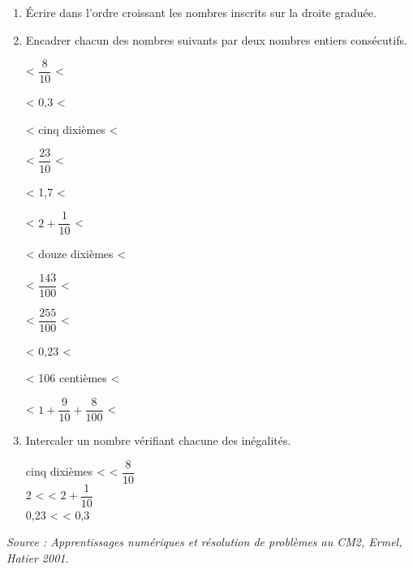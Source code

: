 \documentclass[nocrop]{sesamanuel_college_5e_new}
\begin{document}
\begin{activite}
\begin{QCM}
         \begin{enumerate}
            \item Écrire dans l'ordre croissant les nombres inscrits sur la droite graduée. \par \medskip            
               \pointilles \medskip
            \item Encadrer chacun des nombres suivants par deux nombres entiers consécutifs.
             \setlength{\columnsep}{1cm}           
             \begin{multicols}{3}  
                \pointilles{} < $\dfrac{8}{10}$ < \pointilles \par\bigskip
                \pointilles{} < 0,3 < \pointilles \par\medskip
                \pointilles{} < {\small cinq dixièmes} < \pointilles \par\bigskip
                \pointilles{} < $\dfrac{23}{10}$ < \pointilles \par\bigskip
                \pointilles{} < 1,7 < \pointilles \par\medskip
                \pointilles{} < $2+\dfrac{1}{10}$ < \pointilles \par\bigskip
                \pointilles{} < {\small douze dixièmes} < \pointilles \par\bigskip
                \pointilles{} < $\dfrac{143}{100}$ < \pointilles \par\bigskip
                \pointilles{} < $\dfrac{255}{100}$ < \pointilles \par\bigskip
                \pointilles{} < 0,23 < \pointilles \par\medskip
                \pointilles{} < {\small 106 centièmes} < \pointilles \par\bigskip
                \pointilles{} < $1+\dfrac{9}{10}+\dfrac{8}{100}$ < \pointilles
            \end{multicols}
            \item Intercaler un nombre vérifiant chacune des inégalités.
            \setlength{\columnsep}{1.5cm}
             \begin{multicols}{3}
                {\small cinq dixièmes} < \pointilles{} < $\dfrac{8}{10}$ \\
                2 < \pointilles{} < $2+\dfrac{1}{10}$ \\
                0,23 < \pointilles{} < 0,3
            \end{multicols}
         \end{enumerate}
      \vspace*{-3mm}
   \end{QCM}
   \vfill\hfill{\it\footnotesize Source : Apprentissages numériques et résolution de problèmes au CM2, Ermel, Hatier 2001}.
\end{activite}
\end{document}

